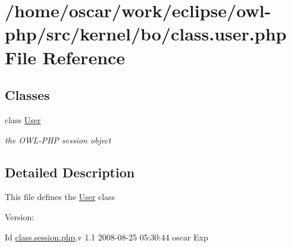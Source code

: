 \hypertarget{class_8user_8php}{
\section{/home/oscar/work/eclipse/owl-php/src/kernel/bo/class.user.php File Reference}
\label{class_8user_8php}
}
\subsection*{Classes}
\begin{CompactItemize}
\item 
class \hyperlink{classUser}{User}
\begin{CompactList}\small\item\em the OWL-PHP session object \item\end{CompactList}\end{CompactItemize}


\subsection{Detailed Description}
This file defines the \hyperlink{classUser}{User} class \begin{Desc}
\item[Version:]\end{Desc}
\begin{Desc}
\item[Id]\hyperlink{class_8session_8php}{class.session.php},v 1.1 2008-08-25 05:30:44 oscar Exp \end{Desc}
